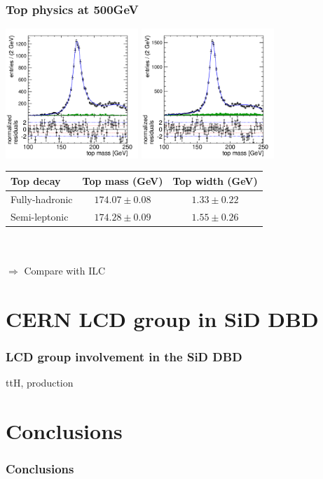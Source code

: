 \documentclass{beamer}
\begin{document}
\begin{frame}
\frametitle{Top physics at 500GeV}
\centering
\includegraphics[width=5cm]{FinalFit-SemiLeptonic}
\includegraphics[width=5cm]{FinalFit-FullHadronic}\\
{\scriptsize
\begin{tabular}{l c c }
\toprule
 Top decay & Top mass (GeV) & Top width (GeV)\\
\midrule
                            Fully-hadronic & $174.07 \pm 0.08$ &  $1.33 \pm 0.22$\\
                            Semi-leptonic & $174.28 \pm 0.09$ &  $1.55 \pm 0.26$\\
\end{tabular}}\\
~\\
$\Rightarrow$ Compare with ILC
\end{frame}



\section[LCD for the DBD]{CERN LCD group in SiD DBD}
\begin{frame}
\frametitle{LCD group involvement in the SiD DBD}
ttH, production
\end{frame}

\section{Conclusions}
\begin{frame}
\frametitle{Conclusions}

\end{frame}
\end{document}
